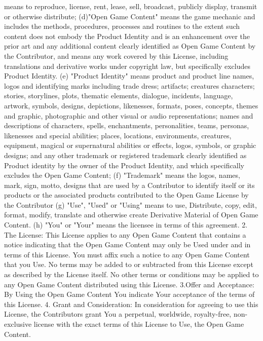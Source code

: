 \begin{multicols}{2}
means to reproduce, license, rent, lease, sell,
broadcast, publicly display, transmit or otherwise
distribute; (d)"Open Game Content" means the
game mechanic and includes the methods,
procedures, processes and routines to the extent
such content does not embody the Product
Identity and is an enhancement over the prior art
and any additional content clearly identified as
Open Game Content by the Contributor, and
means any work covered by this License,
including translations and derivative works under
copyright law, but specifically excludes Product
Identity. (e) "Product Identity" means product
and product line names, logos and identifying
marks including trade dress; artifacts; creatures
characters; stories, storylines, plots, thematic
elements, dialogue, incidents, language, artwork,
symbols, designs, depictions, likenesses, formats,
poses, concepts, themes and graphic,
photographic and other visual or audio
representations; names and descriptions of
characters, spells, enchantments, personalities,
teams, personas, likenesses and special abilities;
places, locations, environments, creatures,
equipment, magical or supernatural abilities or
effects, logos, symbols, or graphic designs; and
any other trademark or registered trademark
clearly identified as Product identity by the
owner of the Product Identity, and which
specifically excludes the Open Game Content; (f)
"Trademark" means the logos, names, mark, sign,
motto, designs that are used by a Contributor to
identify itself or its products or the associated
products contributed to the Open Game License
by the Contributor (g) "Use", "Used" or "Using"
means to use, Distribute, copy, edit, format,
modify, translate and otherwise create Derivative
Material of Open Game Content. (h) "You" or
"Your" means the licensee in terms of this
agreement.
2. The License: This License applies to any Open
Game Content that contains a notice indicating
that the Open Game Content may only be Used
under and in terms of this License. You must affix
such a notice to any Open Game Content that
you Use. No terms may be added to or
subtracted from this License except as described
by the License itself. No other terms or conditions
may be applied to any Open Game Content
distributed using this License.
3.Offer and Acceptance: By Using the Open Game
Content You indicate Your acceptance of the
terms of this License.
4. Grant and Consideration: In consideration for
agreeing to use this License, the Contributors
grant You a perpetual, worldwide, royalty-free,
non-exclusive license with the exact terms of this
License to Use, the Open Game Content.

\end{multicols}
